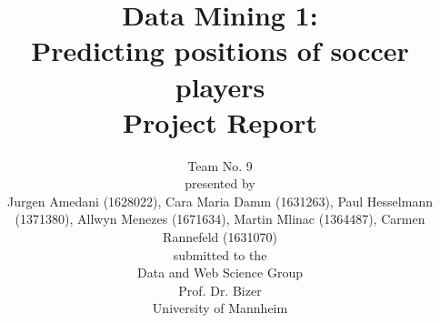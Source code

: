 \documentclass[runningheads]{llncs}
\begin{document}
%
\title{Data Mining 1: \\
Predicting positions of soccer players  \\
Project Report}

\vspace{2cm}
\author{Team No. 9\\
\vspace{1cm}
presented by\\
Jurgen Amedani (1628022), Cara Maria Damm (1631263), Paul Hesselmann (1371380), Allwyn Menezes (1671634), Martin Mlinac (1364487), Carmen Rannefeld (1631070)\\
\vspace{1cm}
submitted to the \\
Data and Web Science Group\\
Prof. Dr. Bizer\\
University of Mannheim}

\institute{}
\maketitle              %
\newpage
%
%
%
%



\end{document}
